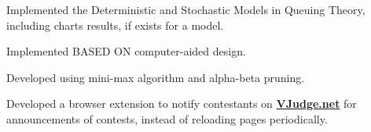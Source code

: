 \documentclass[]{deedy-resume-openfont}
\begin{document}
\begin{minipage}[t]{0.66\textwidth}
\href{https://github.com/ahr9n/in-the-queue-please}{}
\begin{tightemize}
    \item Implemented the Deterministic and Stochastic Models in Queuing Theory, including charts results, if exists for a model.\\
\end{tightemize}
\sectionsep


\href{https://github.com/ahr9n/electrical-network-analyzer}{}
\begin{tightemize}
    \item Implemented BASED ON computer-aided design. \\
\end{tightemize}
\sectionsep

\href{https://github.com/ahr9n/unbeatable-tic-tac-toe}{}
\begin{tightemize}
    \item Developed using mini-max algorithm and alpha-beta pruning.\\ 
\end{tightemize}
\sectionsep

\href{https://github.com/ahr9n/notify-me}{}
\begin{tightemize}
    \item Developed a browser extension to notify contestants on \textbf{\href{VJudge.net}{VJudge.net}} for announcements of contests, instead of reloading pages periodically.\\
\end{tightemize}
\sectionsep



\end{minipage}
\end{document}
